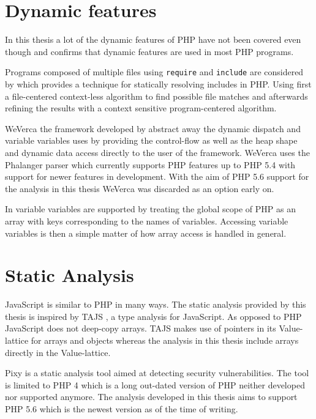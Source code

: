 \section{Dynamic features}
In this thesis a lot of the dynamic features of PHP have not been covered even though  and  confirms that dynamic features are used in most PHP programs.

Programs composed of multiple files using \texttt{require} and \texttt{include} are considered by  which provides a technique for statically resolving includes in PHP. Using first a file-centered context-less algorithm to find possible file matches and afterwards refining the results with a context sensitive program-centered algorithm.

WeVerca the framework developed by  abstract away the dynamic dispatch and variable variables uses by providing the control-flow as well as the heap shape and dynamic data access directly to the user of the framework. WeVerca uses the Phalanger parser which currently supports PHP features up to PHP 5.4 with support for newer features in development. With the aim of PHP 5.6 support for the analysis in this thesis WeVerca was discarded as an option early on.

In  variable variables are supported by treating the global scope of PHP as an array with keys corresponding to the names of variables. Accessing variable variables is then a simple matter of how array access is handled in general.

\section{Static Analysis}
JavaScript is similar to PHP in many ways. The static analysis provided by this thesis is inspired by TAJS , a type analysis for JavaScript. As opposed to PHP JavaScript does not deep-copy arrays. TAJS makes use of pointers in its Value-lattice for arrays and objects whereas the analysis in this thesis include arrays directly in the Value-lattice.

Pixy  is a static analysis tool aimed at detecting security vulnerabilities. The tool is limited to PHP 4 which is a long out-dated version of PHP neither developed nor supported anymore. The analysis developed in this thesis aims to support PHP 5.6 which is the newest version as of the time of writing.

